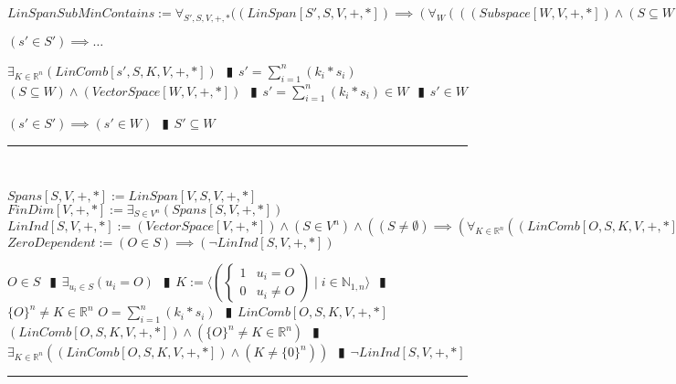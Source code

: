 \documentclass{book}
\newcommand{\abr}{:=}
\newcommand{\pipe}{$\phantom{(}\vrectangleblack\phantom{)}$}
\newcommand{\st}{\mathbin{|}}
\begin{document}
\begin{shaded}
  $LinSpanSubMinContains \abr \forall_{S', S, V, +, *}((LinSpan[S', S, V, +, *]) \implies (\forall_{W}(((Subspace[W, V, + ,*]) \land (S \subseteq W)) \implies (S' \subseteq W)))$
  \begin{enumerate}
    \lit $(s' \in S') \implies \ldots$
    \begin{enumerate}
      \lit $\exists_{K \in \mathbb{R}^n}(LinComb[s', S, K, V, +, *])$ \pipe $s' = \sum_{i = 1}^{n}(k_i * s_i)$
      \lit $(S \subseteq W) \land (VectorSpace[W, V, + ,*])$ \pipe $s' = \sum_{i = 1}^{n}(k_i * s_i) \in W$ \pipe $s' \in W$
    \end{enumerate}
    \lit $(s' \in S') \implies (s' \in W)$ \pipe $S' \subseteq W$
  \end{enumerate} \vspace{.75mm} \hrule \vspace{.75mm} \ \\ 
\end{shaded} %

$Spans[S, V, +, *] \abr LinSpan[V, S, V, +, *]$ \\
$FinDim[V, +, *] \abr \exists_{S \in V^n}(Spans[S, V, +, *])$ \\

$LinInd[S, V, +, *] \abr (VectorSpace[V, +, *]) \land (S \in V^n) \land ((S \neq \emptyset) \implies (\forall_{K \in \mathbb{R}^n}((LinComb[O, S, K, V, +, *]) \implies (K = \{0\}^n))))$ \\

$ZeroDependent \abr (O \in S) \implies (\lnot LinInd[S, V, +, *])$
\begin{enumerate}
  \lit $O \in S$ \pipe $\exists_{u_i \in S}(u_i = O)$ \pipe $K \abr \langle \left(\begin{cases} 
      1 & u_i = O \\
      0 & u_i \neq O 
    \end{cases}\right) \st i \in \mathbb{N}_{1, n} \rangle$ \pipe $\{O\}^n \neq K \in \mathbb{R}^n$
  \lit $O = \sum_{i = 1}^{n}(k_i * s_i)$ \pipe $LinComb[O, S, K, V, +, *]$
  \lit $(LinComb[O, S, K, V, +, *]) \land (\{O\}^n \neq K \in \mathbb{R}^n)$ \pipe $\exists_{K \in \mathbb{R}^n}((LinComb[O, S, K, V, +, *]) \land (K \neq \{0\}^n))$ \pipe $\lnot LinInd[S, V, +, *]$
\end{enumerate} \vspace{.75mm} \hrule \vspace{.75mm} \ \\ 
\end{document}
